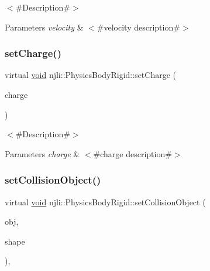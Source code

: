 $<$\#\+Description\#$>$


\begin{DoxyParams}{Parameters}
{\em velocity} & $<$\#velocity description\#$>$ \\
\hline
\end{DoxyParams}
\mbox{\label{classnjli_1_1_physics_body_rigid_a620b7e704797642da0594762ff24a0b8}} 
\subsubsection{\texorpdfstring{set\+Charge()}{setCharge()}}
{\footnotesize\ttfamily virtual \mbox{\hyperlink{_thread_8h_af1e856da2e658414cb2456cb6f7ebc66}{void}} njli\+::\+Physics\+Body\+Rigid\+::set\+Charge (\begin{DoxyParamCaption}\item[{\mbox{\hyperlink{_util_8h_a5f6906312a689f27d70e9d086649d3fd}{f32}}}]{charge }\end{DoxyParamCaption})\hspace{0.3cm}{\ttfamily [virtual]}}

$<$\#\+Description\#$>$


\begin{DoxyParams}{Parameters}
{\em charge} & $<$\#charge description\#$>$ \\
\hline
\end{DoxyParams}
\mbox{\label{classnjli_1_1_physics_body_rigid_a772e64b569e190f647047c0c5be2a852}} 
\subsubsection{\texorpdfstring{set\+Collision\+Object()}{setCollisionObject()}}
{\footnotesize\ttfamily virtual \mbox{\hyperlink{_thread_8h_af1e856da2e658414cb2456cb6f7ebc66}{void}} njli\+::\+Physics\+Body\+Rigid\+::set\+Collision\+Object (\begin{DoxyParamCaption}\item[{const bt\+Collision\+Object \&}]{obj,  }\item[{\mbox{\hyperlink{classnjli_1_1_physics_shape}{Physics\+Shape}} $\ast$}]{shape }\end{DoxyParamCaption})\hspace{0.3cm}{\ttfamily [protected]}, {\ttfamily [virtual]}}



